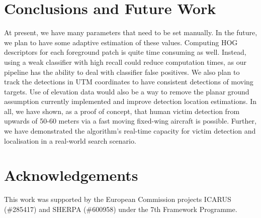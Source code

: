\documentclass[runningheads]{llncs}
\begin{document}
\section{Conclusions and Future Work}

At present, we have many parameters that need to be set manually. In the future, we plan to have some adaptive estimation of these values. Computing HOG descriptors for each foreground patch is quite time consuming as well. Instead, using a weak classifier with high recall could reduce computation times, as our pipeline has the ability to deal with classifier false positives. We also plan to track the detections in UTM coordinates to have consistent detections of moving targets. Use of elevation data would also be a way to remove the planar ground assumption currently implemented and improve detection location estimations. In all, we have shown, as a proof of concept, that human victim detection from upwards of 50-60 meters via a fast moving fixed-wing aircraft is possible. Further, we have demonstrated the algorithm's real-time capacity for victim detection and localisation in a real-world search scenario.

\section*{Acknowledgements}

This work was supported by the European Commission projects ICARUS (\#285417) and SHERPA (\#600958) under the 7th Framework Programme.

\nocite{bal:cha:gra:pae}


\end{document}
